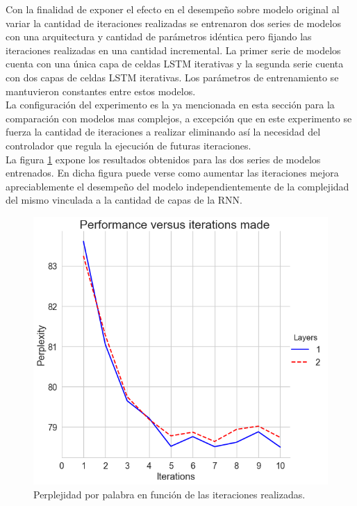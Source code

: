 \documentclass{article}
\begin{document}
	Con la finalidad de exponer el efecto en el desempeño sobre modelo original al variar la cantidad de iteraciones realizadas se entrenaron dos series de modelos con una arquitectura y cantidad de parámetros idéntica pero fijando las iteraciones realizadas en una cantidad incremental. La primer serie de modelos cuenta con una única capa de celdas LSTM iterativas y la segunda serie cuenta con dos capas de celdas LSTM iterativas. Los parámetros de entrenamiento se mantuvieron constantes entre estos modelos.\\
	
	La configuración del experimento es la ya mencionada en esta sección para la comparación con modelos mas complejos, a excepción que en este experimento se fuerza la cantidad de iteraciones a realizar eliminando así la necesidad del controlador que regula la ejecución de futuras iteraciones.\\
	La figura \ref{pplVsIterationsFigure} expone los resultados obtenidos para las dos series de modelos entrenados. En dicha figura puede verse como aumentar las iteraciones mejora apreciablemente el desempeño del modelo independientemente de la complejidad del mismo vinculada a la cantidad de capas de la RNN.
	\begin{figure}
		\centering
		\includegraphics[scale=0.4]{pplVsIterations.png}
		\caption{Perplejidad por palabra en función de las iteraciones realizadas.}
		\label{pplVsIterationsFigure}
	\end{figure}
	
\end{document}
